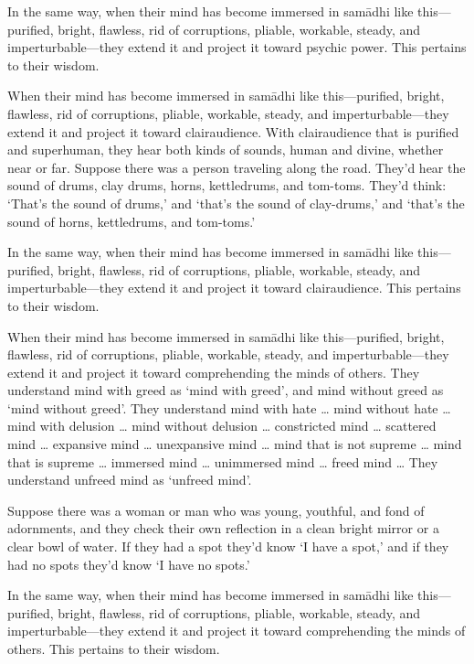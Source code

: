 \documentclass[12pt,openany]{book}%
\begin{document}
In the same way, when their mind has become immersed in \textsanskrit{samādhi} like this—purified, bright, flawless, rid of corruptions, pliable, workable, steady, and imperturbable—they extend it and project it toward psychic power. This pertains to their wisdom. 

When their mind has become immersed in \textsanskrit{samādhi} like this—purified, bright, flawless, rid of corruptions, pliable, workable, steady, and imperturbable—they extend it and project it toward clairaudience. With clairaudience that is purified and superhuman, they hear both kinds of sounds, human and divine, whether near or far. Suppose there was a person traveling along the road. They’d hear the sound of drums, clay drums, horns, kettledrums, and tom-toms. They’d think: ‘That’s the sound of drums,’ and ‘that’s the sound of clay-drums,’ and ‘that’s the sound of horns, kettledrums, and tom-toms.’ 

In the same way, when their mind has become immersed in \textsanskrit{samādhi} like this—purified, bright, flawless, rid of corruptions, pliable, workable, steady, and imperturbable—they extend it and project it toward clairaudience. This pertains to their wisdom. 

When their mind has become immersed in \textsanskrit{samādhi} like this—purified, bright, flawless, rid of corruptions, pliable, workable, steady, and imperturbable—they extend it and project it toward comprehending the minds of others. They understand mind with greed as ‘mind with greed’, and mind without greed as ‘mind without greed’. They understand mind with hate … mind without hate … mind with delusion … mind without delusion … constricted mind … scattered mind … expansive mind … unexpansive mind … mind that is not supreme … mind that is supreme … immersed mind … unimmersed mind … freed mind … They understand unfreed mind as ‘unfreed mind’. 

Suppose there was a woman or man who was young, youthful, and fond of adornments, and they check their own reflection in a clean bright mirror or a clear bowl of water. If they had a spot they’d know ‘I have a spot,’ and if they had no spots they’d know ‘I have no spots.’ 

In the same way, when their mind has become immersed in \textsanskrit{samādhi} like this—purified, bright, flawless, rid of corruptions, pliable, workable, steady, and imperturbable—they extend it and project it toward comprehending the minds of others. This pertains to their wisdom. 
\end{document}
